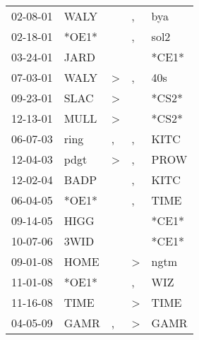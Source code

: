 \begin{supertabular}{p{0.07\textwidth}p{0.06\textwidth}p{0.02\textwidth}p{0.02\textwidth}p{0.06\textwidth}}
 02-08-01\textsuperscript{} &  WALY\textsuperscript{} &               &             , &   bya\textsuperscript{} \\
 02-18-01\textsuperscript{} &                   *OE1* &               &             , &  sol2\textsuperscript{} \\
 03-24-01\textsuperscript{} &  JARD\textsuperscript{} &               &               &                   *CE1* \\
 07-03-01\textsuperscript{} &  WALY\textsuperscript{} &  \textgreater &             , &   40s\textsuperscript{} \\
 09-23-01\textsuperscript{} &  SLAC\textsuperscript{} &  \textgreater &               &                   *CS2* \\
 12-13-01\textsuperscript{} &  MULL\textsuperscript{} &  \textgreater &               &                   *CS2* \\
 06-07-03\textsuperscript{} &  ring\textsuperscript{} &             , &             , &  KITC\textsuperscript{} \\
 12-04-03\textsuperscript{} &  pdgt\textsuperscript{} &  \textgreater &             , &  PROW\textsuperscript{} \\
 12-02-04\textsuperscript{} &  BADP\textsuperscript{} &               &             , &  KITC\textsuperscript{} \\
 06-04-05\textsuperscript{} &                   *OE1* &               &             , &  TIME\textsuperscript{} \\
 09-14-05\textsuperscript{} &  HIGG\textsuperscript{} &               &               &                   *CE1* \\
 10-07-06\textsuperscript{} &  3WID\textsuperscript{} &               &               &                   *CE1* \\
 09-01-08\textsuperscript{} &  HOME\textsuperscript{} &               &  \textgreater &  ngtm\textsuperscript{} \\
 11-01-08\textsuperscript{} &                   *OE1* &               &             , &   WIZ\textsuperscript{} \\
 11-16-08\textsuperscript{} &  TIME\textsuperscript{} &               &  \textgreater &  TIME\textsuperscript{} \\
 04-05-09\textsuperscript{} &  GAMR\textsuperscript{} &             , &  \textgreater &  GAMR\textsuperscript{} \\

\end{supertabular}

